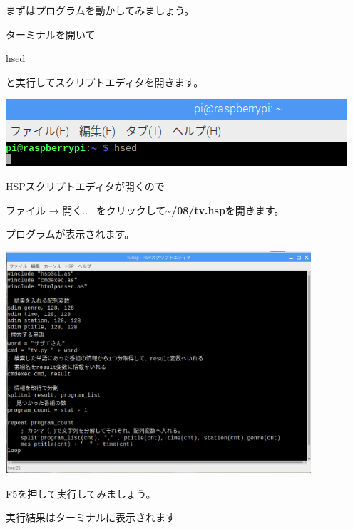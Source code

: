 まずはプログラムを動かしてみましょう。

ターミナルを開いて

hsed

と実行してスクリプトエディタを開きます。

\begin{center}
\includegraphics[width=\textwidth]{./text08-img/textbook-img013.png}

\end{center}

\bigskip



\bigskip

\clearpage
HSPスクリプトエディタが開くので

ファイル → 開く..
\ をクリックして\textbf{{\textasciitilde}/08/tv.hsp}を開きます。

プログラムが表示されます。



\begin{center}
\includegraphics[width=0.85\textwidth]{./text08-img/textbook-img043.png}

\end{center}


\bigskip


F5を押して実行してみましょう。

実行結果はターミナルに表示されます




